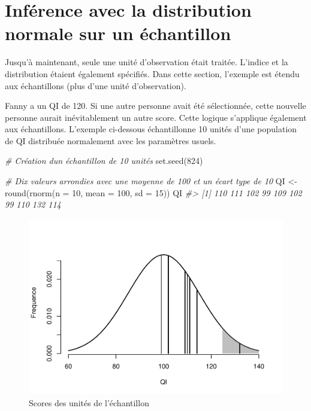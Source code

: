 \documentclass[
]{book}
\newenvironment{Shaded}{}{}
\newcommand{\AttributeTok}[1]{#1}
\newcommand{\CommentTok}[1]{\textit{#1}}
\newcommand{\DecValTok}[1]{#1}
\newcommand{\FunctionTok}[1]{#1}
\newcommand{\NormalTok}[1]{#1}
\newcommand{\OtherTok}[1]{#1}
\begin{document}
\hypertarget{infuxe9rence-avec-la-distribution-normale-sur-un-uxe9chantillon}{%
\section{Inférence avec la distribution normale sur un échantillon}\label{infuxe9rence-avec-la-distribution-normale-sur-un-uxe9chantillon}}

Jusqu'à maintenant, seule une unité d'observation était traitée. L'indice et la distribution étaient également spécifiés. Dans cette section, l'exemple est étendu aux échantillons (plus d'une unité d'observation).

Fanny a un QI de 120. Si une autre personne avait été sélectionnée, cette nouvelle personne aurait inévitablement un autre score. Cette logique s'applique également aux échantillons. L'exemple ci-dessous échantillonne 10 unités d'une population de QI distribuée normalement avec les paramètres usuels.

\begin{Shaded}
\begin{Highlighting}[]
\CommentTok{\# Création d\textquotesingle{}un échantillon de 10 unités}
\FunctionTok{set.seed}\NormalTok{(}\DecValTok{824}\NormalTok{)}

\CommentTok{\# Dix valeurs arrondies avec une moyenne de 100 et un écart type de 10}
\NormalTok{QI }\OtherTok{\textless{}{-}} \FunctionTok{round}\NormalTok{(}\FunctionTok{rnorm}\NormalTok{(}\AttributeTok{n =} \DecValTok{10}\NormalTok{, }\AttributeTok{mean =} \DecValTok{100}\NormalTok{, }\AttributeTok{sd =} \DecValTok{15}\NormalTok{))}
\NormalTok{QI}
\CommentTok{\#\textgreater{}  [1] 110 111 102  99 109 102  99 110 132 114}
\end{Highlighting}
\end{Shaded}

\begin{figure}
\includegraphics[width=0.9\linewidth,height=0.9\textheight]{08-Inferer_files/figure-latex/rept-1} \caption{Scores des unités de l'échantillon}\label{fig:rept}
\end{figure}
\end{document}
